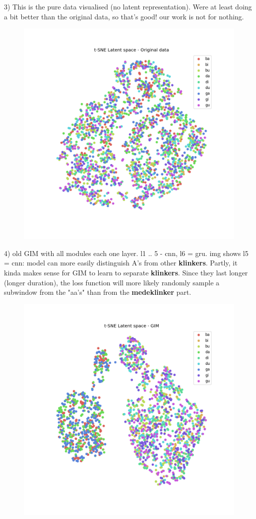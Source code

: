 3) This is the pure data visualised (no latent representation).
Were at least doing a bit better than the original data, so that's good! our work is not for nothing.
\begin{figure}[h]
	\centering
	\includegraphics[width=0.7\linewidth]{"_ t-SNE_latent_space_Original data"}
	\caption{}
	\label{fig:-t-snelatentspaceoriginal-data}
\end{figure}


4) old GIM with all modules each one layer. l1 .. 5 - cnn, l6 = gru. img shows l5 = cnn:
model can more easily distinguish A's from other \textbf{klinkers}. Partly, it kinda makes sense for GIM to learn to separate \textbf{klinkers}. Since they last longer (longer duration), the loss function will more likely randomly sample a subwindow from the "aa's" than from the \textbf{medeklinker} part.


\begin{figure}[h]
	\centering
	\includegraphics[width=0.7\linewidth]{"_ t-SNE_latent_space_GIM multi module cnn layer 5"}
	\caption{}
	\label{fig:-t-snelatentspacegim-multi-module-cnn-layer-5}
\end{figure}
% 	







